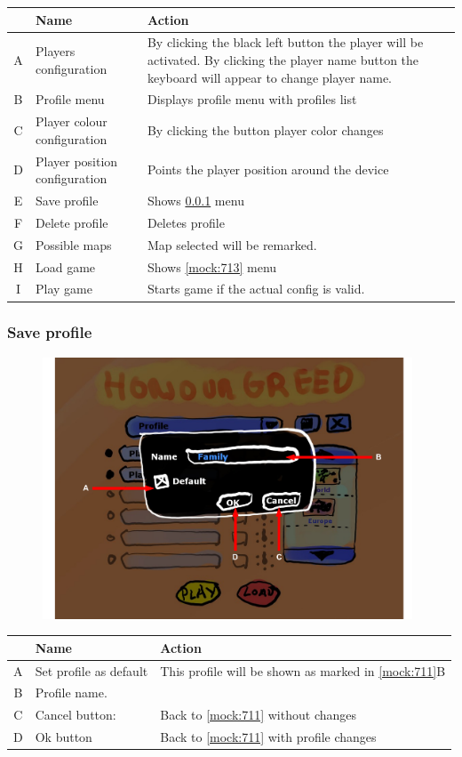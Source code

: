 \documentclass[12pt,a4paper]{article}
\begin{document}
\begin{table}[H]
\small
\centering
\begin{tabular}{c|p{5cm}|p{7cm}}
& Name & Action \\ \hline\hline
A
&Players configuration
&By clicking the black left button the player will be activated. By clicking the player name button the keyboard will appear to change player name.
\\B
&Profile menu
&Displays profile menu with profiles list
\\C
&Player colour configuration
&By clicking the button player color changes
\\D
&Player position configuration
&Points the player position around the device
\\E
&Save profile
&Shows \ref{mock:712} menu
\\F
&Delete profile
&Deletes profile
\\G
&Possible maps
&Map selected will be remarked.
\\H
&Load game
&Shows \ref{mock:713} menu
\\I
&Play game
&Starts game if the actual config is valid.
\end{tabular}
\end{table}

\subsubsection{Save profile}\label{mock:712}

\begin{figure}[H]
  \centering
  \includegraphics[width=11cm]{pic/mocks/1-2.pdf}
\end{figure}

\begin{table}[H]
\small
\centering
\begin{tabular}{c|p{5cm}|p{7cm}}
& Name & Action \\ \hline\hline
A
&Set profile as default
&This profile will be shown as marked in \ref{mock:711}B
\\B
&Profile name.
&
\\C
&Cancel button:
&Back to \ref{mock:711} without changes
\\D
&Ok button
&Back to \ref{mock:711} with profile changes
\end{tabular}
\end{table}
\end{document}
